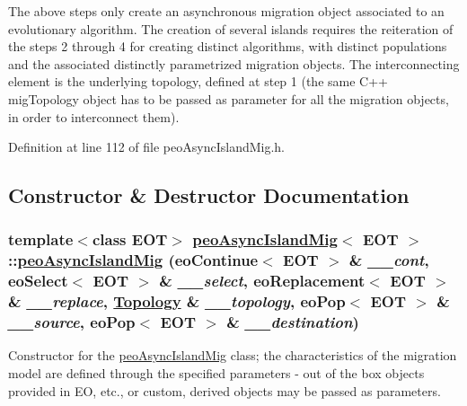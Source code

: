 The above steps only create an asynchronous migration object associated to an evolutionary algorithm. The creation of several islands requires the reiteration of the steps 2 through 4 for creating distinct algorithms, with distinct populations and the associated distinctly parametrized migration objects. The interconnecting element is the underlying topology, defined at step 1 (the same C++ mig\-Topology object has to be passed as parameter for all the migration objects, in order to interconnect them). 



Definition at line 112 of file peo\-Async\-Island\-Mig.h.

\subsection{Constructor \& Destructor Documentation}
\hypertarget{classpeoAsyncIslandMig_e0f706cbf4148d3ca327227a5c7a9fdf}{
\subsubsection[peoAsyncIslandMig]{\setlength{\rightskip}{0pt plus 5cm}template$<$class EOT$>$ \hyperlink{classpeoAsyncIslandMig}{peo\-Async\-Island\-Mig}$<$ EOT $>$::\hyperlink{classpeoAsyncIslandMig}{peo\-Async\-Island\-Mig} (eo\-Continue$<$ EOT $>$ \& {\em \_\-\_\-cont}, eo\-Select$<$ EOT $>$ \& {\em \_\-\_\-select}, eo\-Replacement$<$ EOT $>$ \& {\em \_\-\_\-replace}, \hyperlink{classTopology}{Topology} \& {\em \_\-\_\-topology}, eo\-Pop$<$ EOT $>$ \& {\em \_\-\_\-source}, eo\-Pop$<$ EOT $>$ \& {\em \_\-\_\-destination})}}
\label{classpeoAsyncIslandMig_e0f706cbf4148d3ca327227a5c7a9fdf}


Constructor for the \hyperlink{classpeoAsyncIslandMig}{peo\-Async\-Island\-Mig} class; the characteristics of the migration model are defined through the specified parameters - out of the box objects provided in EO, etc., or custom, derived objects may be passed as parameters. 


